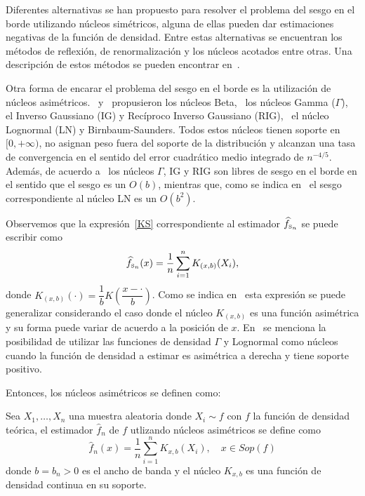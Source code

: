 Diferentes alternativas se han propuesto para resolver el problema del sesgo en el borde utilizando núcleos simétricos, alguna de ellas pueden dar estimaciones negativas de la función de densidad. Entre estas alternativas se encuentran los métodos de reflexión, de renormalización y los núcleos acotados entre otras. Una descripción de estos métodos se pueden encontrar en~\citet{Jones1993}.


Otra forma de encarar el problema del sesgo en el borde es la utilización de núcleos asimétricos.~\citet{Brown1999} y~\citet{chen1999} propusieron los núcleos Beta,~\citet{chensx2000} los núcleos Gamma ($\Gamma$), ~\citet{Scaillet2004} el Inverso Gaussiano (IG) y Recíproco Inverso Gaussiano (RIG),~\citet{Jin2003} el núcleo Lognormal (LN) y Birnbaum-Saunders. Todos estos núcleos tienen soporte en $[0,+\infty)$, no asignan peso fuera del soporte de la distribución y alcanzan una tasa de convergencia en el sentido del error cuadrático medio integrado de $n^{-4/5}.$ Además, de acuerdo a~\citet{Scaillet2004}  los núcleos $\Gamma$, IG y RIG son libres de sesgo en el borde en el sentido que el sesgo es un $O(b)$, mientras que, como se indica en~\citet{Libnegue2013} el sesgo correspondiente al núcleo LN es un $O(b^2)$.

Observemos que la expresión~\ref{KS} correspondiente al estimador $\widehat{f}_{\text{\tiny S}_n}$ se puede escribir como
\begin{align}
\label{DefNucleosSim}
\widehat{f}_{\text{\tiny S}_n}(x)=\dfrac{1}{n} \sum_{i=1}^n K_{(x,b)} (X_i),
\end{align}
donde $K_{(x,b)}(\cdot) =\dfrac{1}{b} K\left(\dfrac{x-\cdot}{b}\right)$. Como se indica en~\citet{Hirukawa2018} esta expresión se puede generalizar considerando el caso donde el núcleo $K_{(x,b)}$ es una función asimétrica y su forma puede variar de acuerdo a la posición de $x$. En~\citet{Silverman1986} se menciona la posibilidad de utilizar las funciones de densidad $\Gamma$ y Lognormal como núcleos cuando la función de densidad a estimar es asimétrica a derecha y tiene soporte positivo. 

Entonces, los núcleos asimétricos se definen como:


\begin{definition}
\label{DefNucleo}
Sea $X_1, \ldots, X_n$ una muestra aleatoria donde $X_i \sim f$ con $f$ la función de densidad teórica, el estimador $\widehat{f}_n$ de $f$ utlizando núcleos asimétricos se define como 
\begin{equation}
\widehat{f}_n(x)=\frac{1}{n}\sum_{i=1}^n K_{x,b}(X_i), \quad x \in Sop(f)
\label{fn}
\end{equation}
donde  $b=b_n>0$ es el ancho de banda  y el núcleo $K_{x,b}$ es una función de densidad continua en su soporte.
\end{definition}

